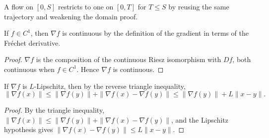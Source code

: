 \begin{definition}
  \label{def:gradientFlow_restrict}
  \leanok{}
  A flow on $[0,S]$ restricts to one on $[0,T]$ for $T\le S$ by reusing the same trajectory
  and weakening the domain proof.
\end{definition}


\begin{lemma}
  \label{lem:gradient_continuous}
  \leanok{}
  \uses{}
  If $f\in C^1$, then $\nabla f$ is continuous by the definition of the gradient in terms of the Fr\'echet derivative.
\end{lemma}
\begin{proof}
  \leanok{}
  $\nabla f$ is the composition of the continuous Riesz isomorphism with $Df$, both continuous when
  $f\in C^1$. Hence $\nabla f$ is continuous.
\end{proof}

\begin{lemma}
  \label{lem:gradient_norm_bound}
  \leanok{}
  \uses{}
  If $\nabla f$ is $L$-Lipschitz, then by the reverse triangle inequality,
  \[
    \|\nabla f(x)\| \le \|\nabla f(y)\| + \|\nabla f(x) - \nabla f(y)\| \le \|\nabla f(y)\| + L\|x-y\|.
  \]
\end{lemma}
\begin{proof}
  \leanok{}
  By the triangle inequality, $\|\nabla f(x)\| \le \|\nabla f(y)\| + \|\nabla f(x)-\nabla f(y)\|$, and
  the Lipschitz hypothesis gives $\|\nabla f(x)-\nabla f(y)\| \le L\|x-y\|$.
\end{proof}

